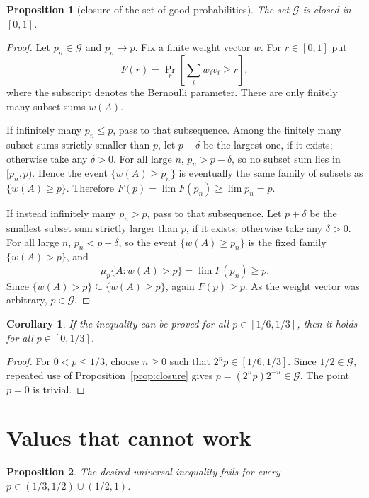 \documentclass[12pt]{article}
\newtheorem{proposition}{Proposition}
\newtheorem{corollary}{Corollary}
\begin{document}
\begin{proposition}[closure of the set of good probabilities]\label{prop:closed}
The set \(\mathcal G\) is closed in \([0,1]\).
\end{proposition}

\begin{proof}
Let \(p_n\in\mathcal G\) and \(p_n\to p\).  Fix a finite weight vector \(w\).
For \(r\in[0,1]\) put
\[
        F(r)=\Pr_r\!\left[\sum_i w_i v_i\ge r\right],
\]
where the subscript denotes the Bernoulli parameter.  There are only finitely
many subset sums \(w(A)\).

If infinitely many \(p_n\le p\), pass to that subsequence.  Among the finitely
many subset sums strictly smaller than \(p\), let \(p-\delta\) be the largest
one, if it exists; otherwise take any \(\delta>0\).  For all large \(n\),
\(p_n>p-\delta\), so no subset sum lies in \([p_n,p)\).  Hence the
event \(\{w(A)\ge p_n\}\) is eventually the same family of subsets as
\(\{w(A)\ge p\}\).  Therefore \(F(p)=\lim F(p_n)\ge\lim p_n=p\).

If instead infinitely many \(p_n>p\), pass to that subsequence.  Let \(p+\delta\)
be the smallest subset sum strictly larger than \(p\), if it exists; otherwise
take any \(\delta>0\).  For all large \(n\), \(p_n<p+\delta\), so the event
\(\{w(A)\ge p_n\}\) is the fixed family \(\{w(A)>p\}\), and
\[
       \mu_p\{A:w(A)>p\}=\lim F(p_n)\ge p .
\]
Since \(\{w(A)>p\}\subseteq\{w(A)\ge p\}\), again \(F(p)\ge p\).  As the weight
vector was arbitrary, \(p\in\mathcal G\).
\end{proof}

\begin{corollary}\label{cor:base}
If the inequality can be proved for all \(p\in[1/6,1/3]\), then it holds for
all \(p\in[0,1/3]\).
\end{corollary}

\begin{proof}
For \(0<p\le1/3\), choose \(n\ge0\) such that \(2^n p\in[1/6,1/3]\).  Since
\(1/2\in\mathcal G\), repeated use of Proposition~\ref{prop:closure} gives
\(p=(2^n p)2^{-n}\in\mathcal G\).  The point \(p=0\) is trivial.
\end{proof}

\section*{Values that cannot work}

\begin{proposition}\label{prop:negative}
The desired universal inequality fails for every
\(p\in(1/3,1/2)\cup(1/2,1)\).
\end{proposition}
\end{document}
